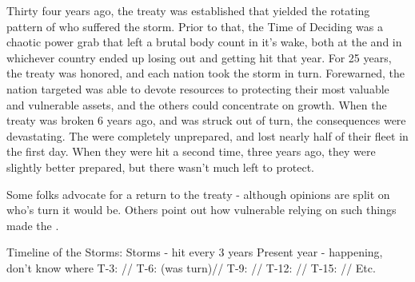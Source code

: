 \documentclass[blue]{GL2020}
\begin{document}
Thirty four years ago, the treaty was established that yielded the rotating pattern of who suffered the storm. Prior to that, the Time of Deciding was a chaotic power grab that left a brutal body count in it's wake, both at the \pSchool{} and in whichever country ended up losing out and getting hit that year. For 25 years, the treaty was honored, and each nation took the storm in turn. Forewarned, the nation targeted was able to devote resources to protecting their most valuable and vulnerable assets, and the others could concentrate on growth. When the treaty was broken 6 years ago, and \pShip{} was struck out of turn, the consequences were devastating. The \pShippies{} were completely unprepared, and lost nearly half of their fleet in the first day. When they were hit a second time, three years ago, they were slightly better prepared, but there wasn't much left to protect.

Some folks advocate for a return to the treaty - although opinions are split on who's turn it would be. Others point out how vulnerable relying on such things made the \pShip{}. %



Timeline of the Storms:
Storms - hit every 3 years
Present year - happening, don’t know where
T-3: \pShip{}//
T-6: \pShip{} (was \pTech{} turn)//
T-9: \pFarm{}//
T-12: \pShip{}//
T-15: \pTech{}//
Etc.
\end{document}
